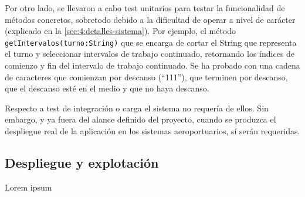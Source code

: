 Por otro lado, se llevaron a cabo test unitarios para testar la funcionalidad de métodos concretos, sobretodo debido a la dificultad de operar a nivel de carácter (explicado en la \autoref{sec:4:detalles-sistema}).
Por ejemplo, el método \texttt{getIntervalos(turno:String)} que se encarga de cortar el String que representa el turno y seleccionar intervalos de trabajo continuado, retornando los índices de comienzo y fin del intervalo de trabajo continuado. Se ha probado con una cadena de caracteres que comienzan por descanso (``111''), que terminen por descanso, que el descanso esté en el medio y que no haya descanso.


Respecto a test de integración o carga el sistema no requería de ellos. Sin embargo, y ya fuera del alance definido del proyecto, cuando se produzca el despliegue real de la aplicación en los sistemas aeroportuarios, sí serán requeridas.

\subsection{Despliegue y explotación} 
\label{sec:4:despliegue}

Lorem ipsum

